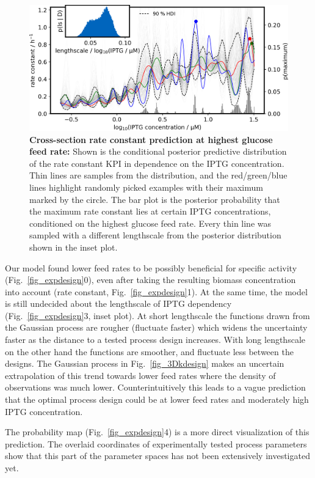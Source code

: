 \documentclass[sn-standardnature]{sn-jnl}%
\theoremstyle{thmstyleone}%
\theoremstyle{thmstyletwo}%
\theoremstyle{thmstylethree}%
\begin{document}
\begin{figure}[H]
    \centering
    \includegraphics[width=1.0\textwidth]{figures/Fig13.png}
    \caption{
        \textbf{Cross-section rate constant prediction at highest glucose feed rate:}
        Shown is the conditional posterior predictive distribution of the rate constant KPI in dependence on the IPTG concentration.
        Thin lines are samples from the distribution, and the red/green/blue lines highlight randomly picked examples with their maximum marked by the circle.
        The bar plot is the posterior probability that the maximum rate constant lies at certain IPTG concentrations, conditioned on the highest glucose feed rate.
        Every thin line was sampled with a different lengthscale from the posterior distribution shown in the inset plot.
    }
    \label{fig_kdesign_crossection}
\end{figure}

Our model found lower feed rates to be possibly beneficial for specific activity (Fig.~\ref{fig_expdesign}0), even after taking the resulting biomass concentration into account (rate constant, Fig.~\ref{fig_expdesign}1).
At the same time, the model is still undecided about the lengthscale of IPTG dependency (Fig.~\ref{fig_expdesign}3, inset plot).
At short lengthscale the functions drawn from the Gaussian process are rougher (fluctuate faster) which widens the uncertainty faster as the distance to a tested  process design increases.
With long lengthscale on the other hand the functions are smoother, and fluctuate less between the designs.
The Gaussian process in Fig.~\ref{fig_3Dkdesign} makes an uncertain extrapolation of this trend towards lower feed rates where the density of observations was much lower.
Counterintuitively this leads to a vague prediction that the optimal process design could be at lower feed rates and moderately high IPTG concentration.

The probability map (Fig.~\ref{fig_expdesign}4) is a more direct visualization of this prediction.
The overlaid coordinates of experimentally tested process parameters show that this part of the parameter spaces has not been extensively investigated yet.
\end{document}
